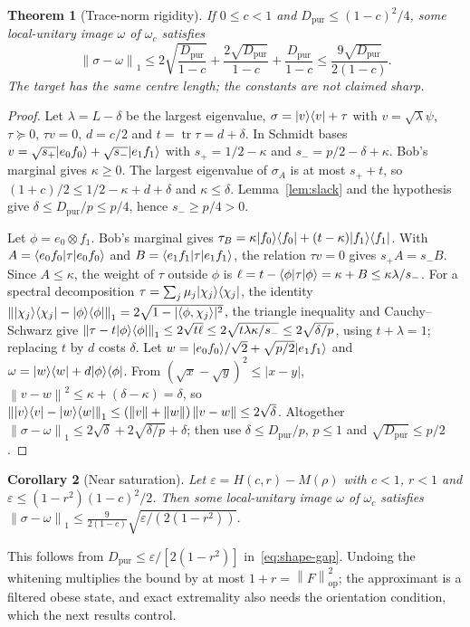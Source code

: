\documentclass[11pt]{article}
\newtheorem{theorem}{Theorem}[section]
\newtheorem{corollary}[theorem]{Corollary}
\theoremstyle{remark}\newtheorem{remark}[theorem]{Remark}
\DeclareMathOperator{\tr}{tr}\DeclareMathOperator{\diag}{diag}
\newcommand{\bra}[1]{\langle#1|}\newcommand{\proj}[1]{\ket{#1}\bra{#1}}
\newcommand{\norm}[1]{\left\lVert#1\right\rVert}
\newcommand{\eps}{\varepsilon}
\newcommand{\Dp}{D_{\mathrm{pur}}}
\begin{document}
\begin{theorem}[Trace-norm rigidity]\label{thm:stability}
If $0\le c<1$ and $\Dp\le(1-c)^2/4$, some local-unitary image $\omega$ of
$\omega_c$ satisfies
\begin{equation}\label{eq:stability}
 \norm{\sigma-\omega}_1
 \le2\sqrt{\frac{\Dp}{1-c}}+\frac{2\sqrt{\Dp}}{1-c}+\frac{\Dp}{1-c}
 \le\frac{9\sqrt{\Dp}}{2(1-c)}.
\end{equation}
The target has the same centre length; the constants are not claimed sharp.
\end{theorem}
\begin{proof}
Let $\lambda=L-\delta$ be the largest eigenvalue, $\sigma=\proj v+\tau$ with
$v=\sqrt\lambda\psi$, $\tau\succeq0$, $\tau v=0$, $d=c/2$ and
$t=\tr\tau=d+\delta$. In Schmidt bases
$v=\sqrt{s_+}|e_0f_0\rangle+\sqrt{s_-}|e_1f_1\rangle$ with $s_+=1/2-\kappa$ and
$s_-=p/2-\delta+\kappa$. Bob's marginal gives $\kappa\ge0$. The largest
eigenvalue of $\sigma_A$ is at most $s_++t$, so
$(1+c)/2\le1/2-\kappa+d+\delta$ and $\kappa\le\delta$. Lemma~\ref{lem:slack}
and the hypothesis give $\delta\le\Dp/p\le p/4$, hence $s_-\ge p/4>0$.

Let $\phi=e_0\otimes f_1$. Bob's marginal gives
$\tau_B=\kappa\proj{f_0}+(t-\kappa)\proj{f_1}$. With
$A=\bra{e_0f_0}\tau\ket{e_0f_0}$ and $B=\bra{e_1f_1}\tau\ket{e_1f_1}$, the
relation $\tau v=0$ gives $s_+A=s_-B$. Since $A\le\kappa$, the weight of $\tau$
outside $\phi$ is $\ell=t-\bra\phi\tau\ket\phi=\kappa+B\le\kappa\lambda/s_-$.
For a spectral decomposition $\tau=\sum_j\mu_j\proj{\chi_j}$, the identity
$\norm{\proj{\chi_j}-\proj\phi}_1=2\sqrt{1-|\langle\phi,\chi_j\rangle|^2}$, the
triangle inequality and Cauchy--Schwarz give
$\norm{\tau-t\proj\phi}_1\le2\sqrt{t\ell}\le2\sqrt{t\lambda\kappa/s_-}\le2\sqrt{\delta/p}$,
using $t+\lambda=1$; replacing $t$ by $d$ costs $\delta$. Let
$w=|e_0f_0\rangle/\sqrt2+\sqrt{p/2}|e_1f_1\rangle$ and
$\omega=\proj w+d\proj\phi$. From $(\sqrt x-\sqrt y)^2\le|x-y|$,
$\norm{v-w}^2\le\kappa+(\delta-\kappa)=\delta$, so
$\norm{\proj v-\proj w}_1\le(\norm v+\norm w)\norm{v-w}\le2\sqrt\delta$.
Altogether $\norm{\sigma-\omega}_1\le2\sqrt\delta+2\sqrt{\delta/p}+\delta$;
then use $\delta\le\Dp/p$, $p\le1$ and $\sqrt{\Dp}\le p/2$.
\end{proof}

\begin{corollary}[Near saturation]\label{cor:near}
Let $\eps=H(c,r)-M(\rho)$ with $c<1$, $r<1$ and $\eps\le(1-r^2)(1-c)^2/2$.
Then some local-unitary image $\omega$ of $\omega_c$ satisfies
$\norm{\sigma-\omega}_1\le\frac{9}{2(1-c)}\sqrt{\eps/(2(1-r^2))}$.
\end{corollary}
This follows from $\Dp\le\eps/[2(1-r^2)]$ in~\eqref{eq:shape-gap}. Undoing the
whitening multiplies the bound by at most $1+r=\norm{F}_{\mathrm{op}}^2$; the
approximant is a filtered obese state, and exact extremality also needs the
orientation condition, which the next results control.
\end{document}
